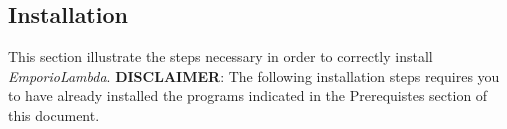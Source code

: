 \subsection{Installation}
This section illustrate the steps necessary in order to correctly install \textit{EmporioLambda}.
\textbf{DISCLAIMER}: The following installation steps requires you to have already installed the programs indicated in the Prerequistes section of this document.

